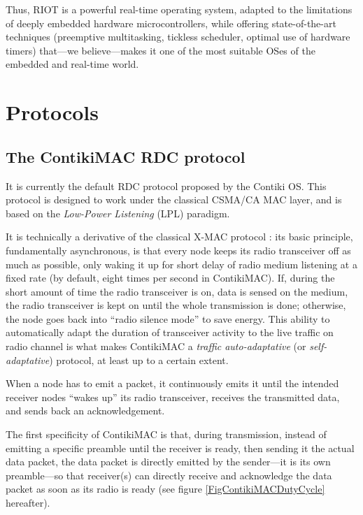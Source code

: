 \documentclass[conference]{IEEEtran}
\begin{document}
Thus, RIOT is a powerful real-time operating system, adapted to the
limitations of deeply embedded hardware microcontrollers, while offering
state-of-the-art techniques (preemptive multitasking, tickless scheduler,
optimal use of hardware timers) that---we believe---makes it one of
the most suitable OSes of the embedded and real-time world.



\section{Protocols}
\label{SectProtoDescription}

\subsection{The ContikiMAC RDC protocol}

It is currently the default RDC protocol proposed by the Contiki OS.
This protocol is designed to work under the classical CSMA/CA MAC layer,
and is based on the \emph{Low-Power Listening} (LPL) paradigm.

It is technically a derivative of the classical X-MAC protocol \cite{XMAC}:
its basic principle, fundamentally asynchronous, is that every node keeps
its radio transceiver off as much as possible, only waking it up for short
delay of radio medium listening at a fixed rate (by default, eight times
per second in ContikiMAC). If, during the short amount of time the radio
transceiver is on, data is sensed on the medium, the radio transceiver
is kept on until the whole transmission is done; otherwise, the node
goes back into ``radio silence mode'' to save energy.
This ability to automatically adapt the duration of transceiver activity
to the live traffic on radio channel is what makes ContikiMAC a
\emph{traffic auto-adaptative} (or \emph{self-adaptative}) protocol,
at least up to a certain extent.

When a node has to emit a packet, it continuously emits it until the
intended receiver nodes ``wakes up'' its radio transceiver, receives
the transmitted data, and sends back an acknowledgement.

The first specificity of ContikiMAC is that, during transmission, instead
of emitting a specific preamble until the receiver is ready, then sending
it the actual data packet, the data packet is directly emitted by the
sender---it is its own preamble---so that receiver(s) can directly receive
and acknowledge the data packet as soon as its radio is ready (see figure
\ref{FigContikiMACDutyCycle} hereafter).
\end{document}

